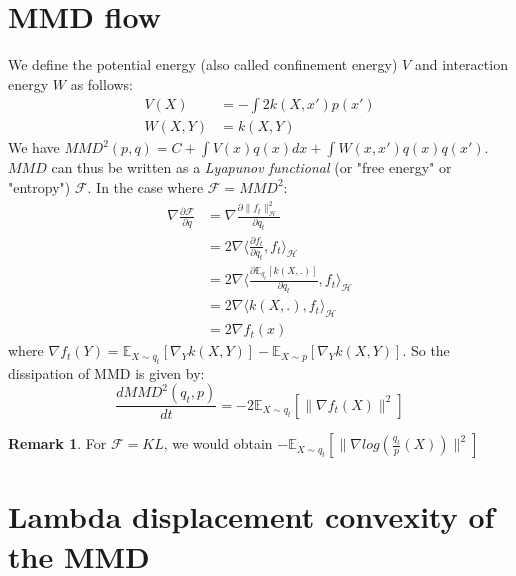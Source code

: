 \documentclass{article}
\newcommand{\1}{\mathbbm 1}
\newcommand{\E}{{{\mathbb E}}}
\newcommand{\kH}{{{\mathcal H}}}
\newcommand{\F}{{{\mathcal F}}}
\theoremstyle{definition}
\newtheorem{remark}{Remark}
\begin{document}
\section{MMD flow}

We define the potential energy (also called confinement energy) $V$ and interaction energy $W$ as follows:
\begin{align}
    V(X)&=-\int 2 k(X,x')p(x')\\
    W(X,Y)&=k(X,Y)
\end{align}
We have $MMD^2(p,q)=C+ \int V(x) q(x)dx + \int W(x,x')q(x)q(x')$. $MMD$ can thus be written as a \textit{Lyapunov functional} (or "free energy" or "entropy") $\F$.
In the case where $\F=MMD^2$:
\begin{align}
        \nabla \frac{\partial \F}{\partial q}&= \nabla \frac{\partial \|f_t\|^2_{\kH}}{\partial q_t}\\
        &=2 \nabla \langle \frac{\partial f_t}{\partial q_t}, f_t \rangle_{\kH}\\
        &=2 \nabla \langle \frac{\partial \E_{q_t}[k(X,.)]}{\partial q_t}, f_t \rangle_{\kH}\\
        &=2 \nabla \langle k(X,.), f_t \rangle_{\kH}\\
        &= 2 \nabla f_t(x)
\end{align}
where $\nabla f_t(Y)= \E_{X \sim q_t}[\nabla_{Y}k(X,Y)] -  \E_{X \sim p}[\nabla_{Y}k(X,Y)]$. So the dissipation of MMD is given by:  
\begin{equation}
    \frac{d MMD^2(q_t, p)}{dt}=-2 \E_{X \sim q_t}[\|\nabla f_t(X)\|^2]
\end{equation}

\begin{remark}
For $\F=KL$, we would obtain $-\E_{X \sim q_t}[\|\nabla log(\frac{q_t}{p}(X))\|^2]$
\end{remark}



\section{Lambda displacement convexity of the MMD}
\end{document}
